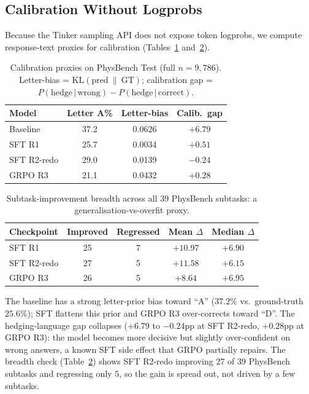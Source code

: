 \documentclass{article}
\begin{document}
\subsection{Calibration Without Logprobs}

Because the Tinker sampling API does not expose token logprobs, we
compute response-text proxies for calibration
(Tables~\ref{tab:calib} and~\ref{tab:breadth}).

\begin{table}[t]
\caption{Calibration proxies on PhysBench Test (full $n{=}9{,}786$).
Letter-bias = $\mathrm{KL}(\text{pred}~\|~\text{GT})$; calibration gap =
$P(\text{hedge}\,|\,\text{wrong}) - P(\text{hedge}\,|\,\text{correct})$.}
\label{tab:calib}
\centering
\small
\begin{tabular}{lccc}
\toprule
Model & Letter A\% & Letter-bias & Calib.\ gap \\
\midrule
Baseline      & 37.2 & 0.0626 & $+6.79$ \\
SFT R1        & 25.7 & 0.0034 & $+0.51$ \\
SFT R2-redo   & 29.0 & 0.0139 & $-0.24$ \\
GRPO R3       & 21.1 & 0.0432 & $+0.28$ \\
\bottomrule
\end{tabular}
\end{table}

\begin{table}[t]
\caption{Subtask-improvement breadth across all $39$ PhysBench
subtasks: a generalisation-vs-overfit proxy.}
\label{tab:breadth}
\centering
\footnotesize
\setlength{\tabcolsep}{4pt}
\begin{tabular}{lcccc}
\toprule
Checkpoint & Improved & Regressed & Mean $\Delta$ & Median $\Delta$ \\
\midrule
SFT R1      & 25 & 7 & $+10.97$ & $+6.90$ \\
SFT R2-redo & 27 & 5 & $+11.58$ & $+6.15$ \\
GRPO R3     & 26 & 5 & $+8.64$  & $+6.95$ \\
\bottomrule
\end{tabular}
\end{table}

The baseline has a strong letter-prior bias toward ``A''
($37.2\%$ vs.\ ground-truth $25.6\%$); SFT flattens this prior and
GRPO R3 over-corrects toward ``D''. The hedging-language gap
collapses (${+}6.79$ to ${-}0.24$pp at SFT R2-redo, ${+}0.28$pp
at GRPO R3): the model becomes more decisive but slightly
over-confident on wrong answers, a known SFT side effect that
GRPO partially repairs. The breadth check (Table~\ref{tab:breadth})
shows SFT R2-redo improving $27$ of $39$ PhysBench subtasks and
regressing only $5$, so the gain is spread out, not driven by a few
subtasks.
\end{document}
